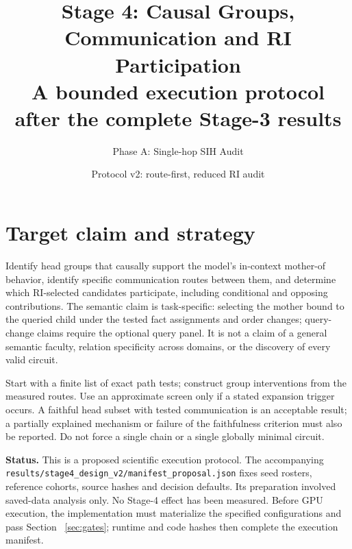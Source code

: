 \documentclass[11pt,a4paper]{article}
\title{Stage 4: Causal Groups, Communication and RI Participation\\
\large A bounded execution protocol after the complete Stage-3 results}
\author{Phase A: Single-hop SIH Audit}
\date{Protocol v2: route-first, reduced RI audit}
\newcommand{\file}[1]{\nolinkurl{#1}}
\begin{document}
\maketitle

\section{Target claim and strategy}
Identify head groups that causally support the model's in-context mother-of
behavior, identify specific communication routes between them, and determine which
RI-selected candidates participate, including conditional and opposing contributions.
The semantic claim is task-specific: selecting the mother bound to the queried child
under the tested fact assignments and order changes; query-change claims require the optional query panel. It is not a claim of a general semantic
faculty, relation specificity across domains, or the discovery of every valid circuit.

Start with a finite list of exact path tests; construct group interventions from the measured routes. Use an
approximate screen only if a stated expansion trigger occurs. A faithful head subset
with tested communication is an acceptable result; a partially explained mechanism
or failure of the faithfulness criterion must also be reported. Do not force a single
chain or a single globally minimal circuit.

\textbf{Status.} This is a proposed scientific execution protocol. The accompanying
\file{results/stage4_design_v2/manifest_proposal.json} fixes seed rosters, reference
cohorts, source hashes and decision defaults. Its preparation involved saved-data
analysis only. No Stage-4 effect has been measured. Before GPU execution, the
implementation must materialize the specified configurations and pass Section~
\ref{sec:gates}; runtime and code hashes then complete the execution manifest.
\end{document}

